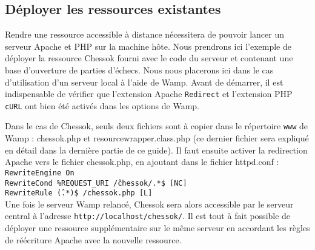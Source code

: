 \documentclass[a4paper,11pt]{article}
\begin{document}
\subsection{Déployer les ressources existantes}
		Rendre une ressource accessible à distance nécessitera de pouvoir lancer un serveur Apache et PHP sur la machine hôte. Nous prendrons ici l'exemple de déployer la ressource Chessok fourni avec le code du serveur et contenant une base d'ouverture de parties d'échecs. Nous nous placerons ici dans le cas d'utilisation d'un serveur local à l'aide de Wamp. Avant de démarrer, il est indispensable de vérifier que l'extension Apache {\tt Redirect} et l'extension PHP {\tt cURL} ont bien été activés dans les options de Wamp.
		
		Dans le cas de Chessok, seuls deux fichiers sont à copier dans le répertoire {\tt www} de Wamp : chessok.php et resourcewrapper.class.php (ce dernier fichier sera expliqué en détail dans la dernière partie de ce guide). Il faut ensuite activer la redirection Apache vers le fichier chessok.php, en ajoutant dans le fichier httpd.conf :
\\{\tt	RewriteEngine On\\
RewriteCond \%{REQUEST\_URI} \^/chessok/.*\$ [NC]\\
RewriteRule \^(.*)\$ /chessok.php [L] }\\
		Une fois le serveur Wamp relancé, Chessok sera alors accessible par le serveur central à l'adresse {\tt http://localhost/chessok/}. Il est tout à fait possible de déployer une ressource supplémentaire sur le même serveur en accordant les règles de réécriture Apache avec la nouvelle ressource.
		
\end{document}
